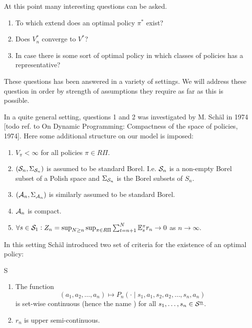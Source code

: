 At this point many interesting questions can be asked.
\begin{enumerate}
  \item To which extend does an optimal policy $\pi^*$ exist?
  \item Does $V_n^*$ converge to $V^*$?
  \item In case there is some sort of optimal policy
    in which classes of policies has a representative?
\end{enumerate}
These questions has been answered in a variety of settings.
We will address these question in order by strength of assumptions
they require as far as this is possible.

In a quite general setting, questions 1 and 2
was investigated by M. Schäl in 1974
[todo ref. to On Dynamic Programming:
Compactness of the space of policies, 1974].
Here some additional structure on our model is imposed:
\begin{sett}[Schäl]
  \begin{enumerate}
    \item $V_\pi < \infty$ for all policies $\pi \in R\Pi$.
    \item $(\mathcal{S}_n, \Sigma_{\mathcal{S}_n})$ is assumed to be standard Borel.
      I.e. $\mathcal{S}_n$ is a non-empty Borel subset of a Polish space
      and $\Sigma_{\mathcal{S}_n}$ is the Borel subsets of $S_n$.
    \item $(\mathcal{A}_n, \Sigma_{\mathcal{A}_n})$ is similarly assumed to be
      standard Borel.
    \item $\mathcal{A}_n$ is compact.
    \item $\forall s \in \mathcal{S}_1 :
      Z_n = \sup_{N \geq n} \sup_{\pi \in R\Pi} \sum_{t=n+1}^N
      \mathbb{E}_s^\pi r_n \to 0$ as $n \to \infty$.
  \end{enumerate}
  \label{sett:Schal}
\end{sett}

In this setting Schäl introduced two set of criteria for the existence
of an optimal policy:

\begin{cond}{S}
  \begin{enumerate}
    \item The function \[
	(a_1, a_2, \dots, a_n) \mapsto
	P_n(\cdot \mid s_1, a_1, s_2, a_2, \dots, s_n, a_n)
      \]
      is set-wise continuous (hence the name )
      for all $s_1, \dots, s_n \in \mathcal{S}^{\underline{n}}$.
    \item $r_n$ is upper semi-continuous.
  \end{enumerate}
  \label{cond:S}
\end{cond}


